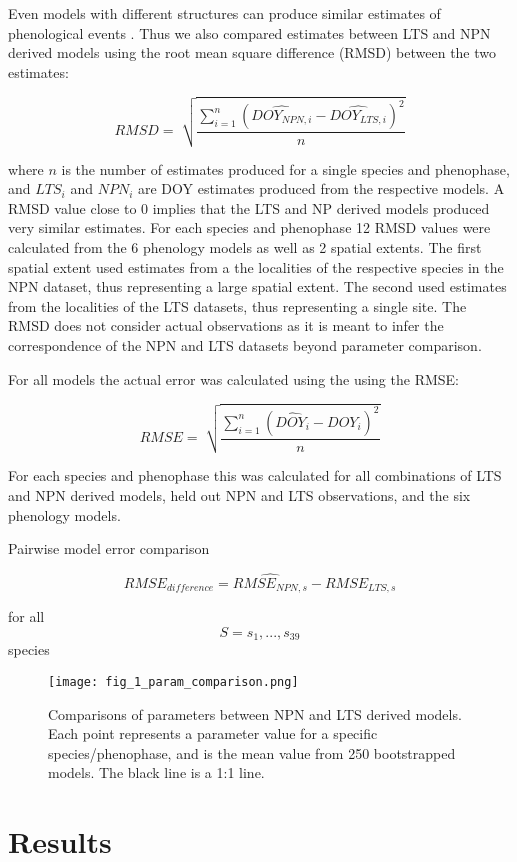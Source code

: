 \documentclass[fleqn,10pt,lineno]{wlpeerj} %
\begin{document}
Even models with different structures can produce similar estimates of phenological events \citep{basler2016}. Thus we also compared estimates between LTS and NPN derived models using the root mean square difference (RMSD) between the two estimates:

$$ RMSD = \sqrt[]{ \frac{\sum_{i=1}^{n}(\widehat{DOY_{NPN,i}} - \widehat{DOY_{LTS,i}})^{2}}{n}} $$

where $n$ is the number of estimates produced for a single species and phenophase, and $LTS_{i}$ and $NPN_{i}$ are DOY estimates produced from the respective models. A RMSD value close to 0 implies that the LTS and NP derived models produced very similar estimates. For each species and phenophase 12 RMSD values were calculated from the 6 phenology models as well as 2 spatial extents. The first spatial extent used estimates from a the localities of the respective species in the NPN dataset, thus representing a large spatial extent. The second used estimates from the localities of the LTS datasets, thus representing a single site. The RMSD does not consider actual observations as it is meant to infer the correspondence of the NPN and LTS datasets beyond parameter comparison. 

For all models the actual error was calculated using the using the RMSE:

$$ RMSE = \sqrt[]{ \frac{\sum_{i=1}^{n}(\widehat{DOY_{i}} - DOY_{i})^{2}}{n}} $$

For each species and phenophase this was calculated for all combinations of LTS and NPN derived models, held out NPN and LTS observations, and the six phenology models. 

Pairwise model error comparison

$$ RMSE_{difference} = \widehat{RMSE_{NPN,s}} - RMSE_{LTS,s} $$

for all $$S = s_{1},...,s_{39}$$ species

\begin{figure}[]
	\centering
		\texttt{[image: fig\_1\_param\_comparison.png]}
	\caption{Comparisons of parameters between NPN and LTS derived models. Each point represents a parameter value for a specific species/phenophase, and is the mean value from 250 bootstrapped  models. The black line is a 1:1 line.}
\end{figure}


\section*{Results}
\end{document}
